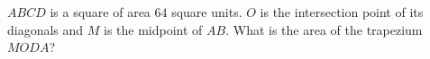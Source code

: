$ABCD$ is a square of area $64$ square units. $O$ is the intersection point of its diagonals and $M$ is the midpoint of $AB$. What is the area of the trapezium $MODA$?
